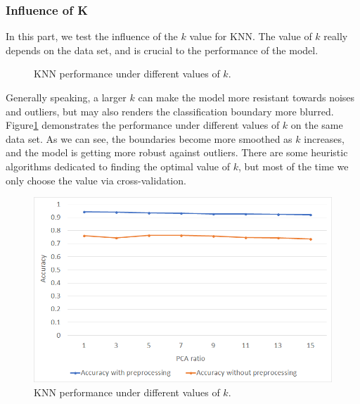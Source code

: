 \documentclass{article}
\begin{document}
\subsubsection{Influence of K}
In this part, we test the influence of the $k$ value for KNN. The value of $k$ really depends on the data set, and is crucial to the performance of the model.

\begin{figure}[!htb]
	\centering
	\hspace{.2in}
	\caption{KNN performance under different values of $k$.}\label{fig:KNN}
\end{figure}

Generally speaking, a larger $k$ can make the model more resistant towards noises and outliers, but may also renders the classification boundary more blurred. Figure\ref{fig:KNN} demonstrates the performance under different values of $k$ on the same data set. As we can see, the boundaries become more smoothed as $k$ increases, and the model is getting more robust against outliers. There are some heuristic algorithms dedicated to finding the optimal value of $k$, but most of the time we only choose the value via cross-validation. 

\begin{figure}[!htb]
	\centering\includegraphics[width=.8\textwidth]{fig/KNN_K}
	\caption{KNN performance under different values of $k$.}\label{fig:KNN_K}
\end{figure}
\end{document}
